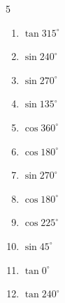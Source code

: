 \begin{multicols}{5}
\begin{enumerate}

  \item $\displaystyle \tan{315^\circ}$

        \phantom{$\displaystyle =-1$}

  \item $\displaystyle \sin{240^\circ}$


  \item $\displaystyle \sin{270^\circ}$

        \phantom{$\displaystyle =-1$}

  \item $\displaystyle \sin{135^\circ}$


  \item $\displaystyle \cos{360^\circ}$

        \phantom{$\displaystyle =1$}

  \item $\displaystyle \cos{180^\circ}$

        \phantom{$\displaystyle =-1$}

\columnbreak %

  \item $\displaystyle \sin{270^\circ}$

        \phantom{$\displaystyle =-1$}

  \item $\displaystyle \cos{180^\circ}$

        \phantom{$\displaystyle =-1$}

  \item $\displaystyle \cos{225^\circ}$


  \item $\displaystyle \sin{45^\circ}$


  \item $\displaystyle \tan{0^\circ}$

        \phantom{$\displaystyle =0$}

  \item $\displaystyle \tan{240^\circ}$



\end{enumerate}
\end{multicols}
